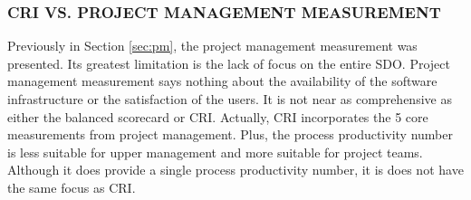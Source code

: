 \documentclass[SDSUThesis.tex]{subfiles}
\begin{document}
        
        \subsubsection{CRI VS. PROJECT MANAGEMENT MEASUREMENT}
            Previously in Section \ref{sec:pm}, the project management
            measurement was presented.   Its greatest limitation is the lack of
            focus on the entire SDO.  Project management measurement says 
            nothing about the availability of the software infrastructure
            or the satisfaction of the users.  It is not near as comprehensive
            as either the balanced scorecard or CRI. Actually, CRI incorporates
            the 5 core measurements from project management.
            Plus, the process productivity
            number is less suitable for upper management and more
            suitable for project teams.  Although it does provide a single
            process productivity number, it is does not have the same focus
            as CRI.
            
            
            
            
\end{document}

